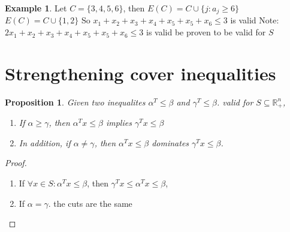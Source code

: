 \documentclass{article}
\theoremstyle{plain}
\newtheorem{prop}{Proposition}
\theoremstyle{definition}
\newtheorem{eg}{Example}
\begin{document}
\begin{eg}
    Let $C = \{3, 4, 5, 6\}$, then $E(C) = C \cup \{j: a_j \geq 6\}$\\
    $E(C) = C \cup \{1,2\}$
    So $x_1 + x_2 + x_3 + x_4 + x_5 + x_5 + x_6 \leq 3$ is valid
    Note:
    $2x_1 + x_2 + x_3 + x_4 + x_5 + x_5 + x_6 \leq 3$ is valid
    be proven to be valid for $S$
\end{eg}

\section{Strengthening cover inequalities}
\begin{prop}
    Given two inequalites $\alpha^T\leq\beta$ and $\gamma^T\leq\beta$.
    valid for $S\subseteq\mathbb{R}^n_+$,
    \begin{enumerate}
        \item If $\alpha\geq\gamma$, then $\alpha^Tx\leq\beta$ implies
            $\gamma^Tx\leq\beta$
        \item In addition, if $\alpha\ne\gamma$, then $\alpha^Tx\leq \beta$
            dominates $\gamma^Tx\leq\beta$.
    \end{enumerate}
\end{prop}
\begin{proof}
    \begin{enumerate}
        \item If $\forall x\in S: \alpha^Tx\leq\beta$,
            then $\gamma^T x\leq \alpha^Tx \leq \beta$,
        \item If $\alpha = \gamma$. the cuts are the same
    \end{enumerate}
\end{proof}
\end{document}

